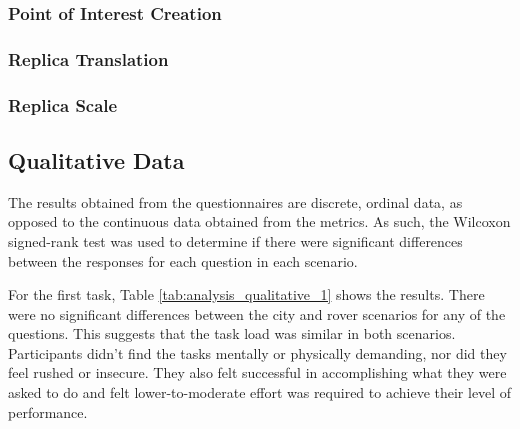         \subsubsection{Point of Interest Creation}


        \subsubsection{Replica Translation}

        \subsubsection{Replica Scale}

    \subsection{Qualitative Data}

        The results obtained from the questionnaires are discrete, ordinal data, as opposed to the continuous data obtained from the metrics. As such, the Wilcoxon signed-rank test was used to determine if there were significant differences between the responses for each question in each scenario.

        For the first task, Table \ref{tab:analysis_qualitative_1} shows the results. There were no significant differences between the city and rover scenarios for any of the questions. This suggests that the task load was similar in both scenarios. Participants didn't find the tasks mentally or physically demanding, nor did they feel rushed or insecure. They also felt successful in accomplishing what they were asked to do and felt lower-to-moderate effort was required to achieve their level of performance.
       
